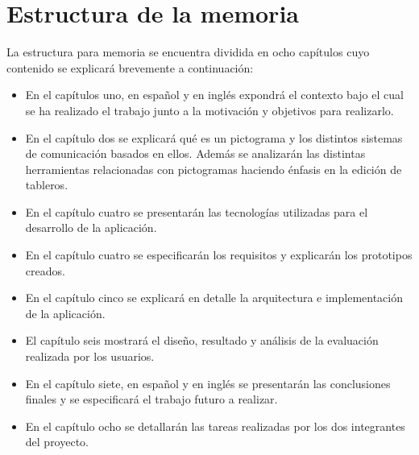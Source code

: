 \section{Estructura de la memoria}
\label{cap1:sec:Estructura}

La estructura para memoria se encuentra dividida en ocho capítulos cuyo contenido se explicará brevemente a continuación: 
\begin{itemize}
	\item En el capítulos uno, en español y en inglés expondrá el contexto bajo el cual se ha realizado el trabajo junto a la motivación y objetivos para realizarlo.
	
	\item En el capítulo dos se explicará qué es un pictograma y los distintos sistemas de comunicación basados en ellos. Además se analizarán las distintas herramientas relacionadas con pictogramas haciendo énfasis en la edición de tableros.
	
	\item En el capítulo cuatro se presentarán las tecnologías utilizadas para el desarrollo de la aplicación.
	
	\item En el capítulo cuatro se especificarán los requisitos y explicarán los prototipos creados.
	
	\item En el capítulo cinco se explicará en detalle la arquitectura e implementación de la aplicación.
	
	\item El capítulo seis mostrará el diseño, resultado y análisis de la evaluación realizada por los usuarios. 
	
	\item En el capítulo siete, en español y en inglés se presentarán las conclusiones finales y se especificará el trabajo futuro a realizar.
	
	\item En el capítulo ocho se detallarán las tareas realizadas por los dos integrantes del proyecto.
\end{itemize}	




